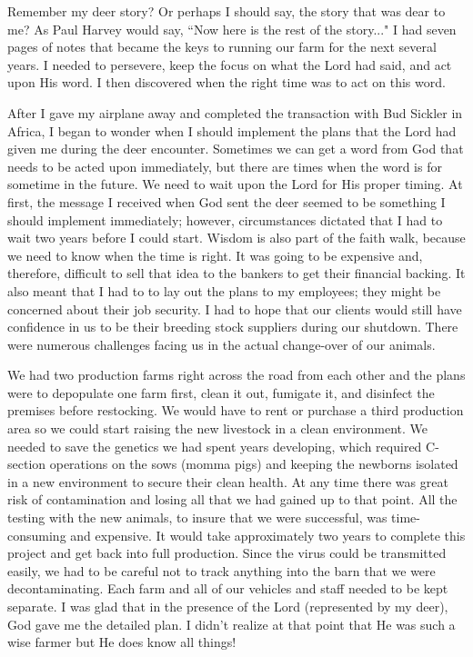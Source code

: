 \documentclass[oneside,12pt]{book}
\begin{document}
Remember my deer story? Or perhaps I should say, the story that was dear to me? As Paul Harvey would say, ``Now here is the rest of the story..." I had seven pages of notes that became the keys to running our farm for the next several years. I needed to persevere, keep the focus on what the Lord had said, and act upon His word. I then discovered when the right time was to act on this word.

After I gave my airplane away and completed the transaction with Bud Sickler in Africa, I began to wonder when I should implement the plans that the Lord had given me during the deer encounter. Sometimes we can get a word from God that needs to be acted upon immediately, but there are times when the word is for sometime in the future. We need to wait upon the Lord for His proper timing. At first, the message I received when God sent the deer seemed to be something I should implement immediately; however, circumstances dictated that I had to wait two years before I could start. Wisdom is also part of the faith walk, because we need to know when the time is right. It was going to be expensive and, therefore, difficult to sell that idea to the bankers to get their financial backing. It also meant that I had to to lay out the plans to my employees; they might be concerned about their job security. I had to hope that our clients would still have confidence in us to be their breeding stock suppliers during our shutdown. There were numerous challenges facing us in the actual change-over of our animals. 
 
We had two production farms right across the road from each other and the plans were to depopulate one farm first, clean it out, fumigate it, and disinfect the premises before restocking. We would have to rent or purchase a third production area so we could start raising the new livestock in a clean environment. We needed to save the genetics we had spent years developing, which required C-section operations on the sows (momma pigs) and keeping the newborns isolated in a new environment to secure their clean health. At any time there was great risk of contamination and losing all that we had gained up to that point. All the testing with the new animals, to insure that we were successful, was time-consuming and expensive. It would take approximately two years to complete this project and get back into full production. Since the virus could be transmitted easily, we had to be careful not to track anything into the barn that we were decontaminating. Each farm and all of our vehicles and staff needed to be kept separate. I was glad that in the presence of the Lord (represented by my deer), God gave me the detailed plan. I didn't realize at that point that He was such a wise farmer but He does know all things!
\end{document}
